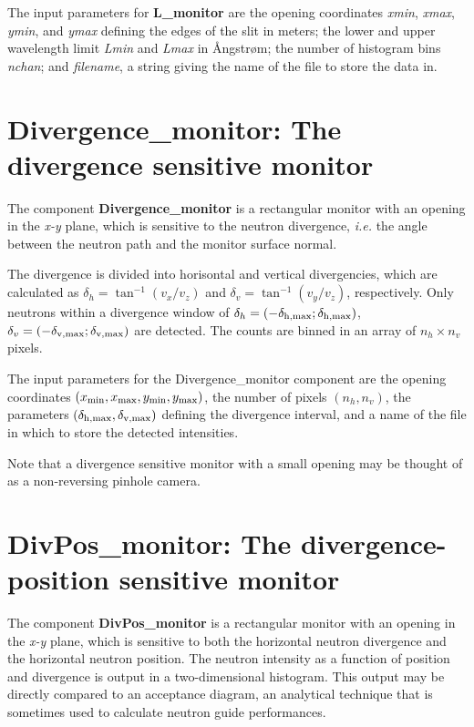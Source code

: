 The input parameters for {\bf L\_monitor} are the opening
coordinates \textit{xmin}, \textit{xmax}, \textit{ymin}, and
\textit{ymax} defining the edges of the slit in meters;
the lower and upper wavelength limit \textit{Lmin} and
\textit{Lmax} in {\AA}ngstr{\o}m; the number of histogram bins
\textit{nchan}; and \textit{filename}, a
string giving the name of the file to store the data in.


\section{Divergence\_monitor: The divergence sensitive monitor}

The component {\bf Divergence\_monitor} is a rectangular monitor
with an opening in the \textit{x-y} plane,
which is sensitive to the neutron divergence, {\em i.e.} the angle
between the neutron path and the monitor surface normal.
 
The divergence is divided into horisontal and vertical divergencies,
which are calculated as $\delta_h = \tan^{-1}(v_x/v_z)$ 
and $\delta_v = \tan^{-1}(v_y/v_z)$, respectively. 
Only neutrons within a divergence window of 
$\delta_h = (-\delta_{\rm h,max} ; \delta_{\rm h,max})$, 
$\delta_v = (-\delta_{\rm v,max} ; \delta_{\rm v,max})$ 
are detected. The counts are binned in an array of $n_h \times n_v$ pixels.

The input parameters for the Divergence\_monitor component are the opening coordinates
$(x_{\rm min}, x_{\rm max}, y_{\rm min}, y_{\rm max})$, 
the number of pixels $(n_h, n_v)$, 
the parameters $(\delta_{\rm h,max}, \delta_{\rm v,max})$ 
defining the divergence interval,
and a name of the file in which to store the detected intensities.

Note that a divergence sensitive monitor with a small opening may be 
thought of as a non-reversing pinhole camera.


\section{DivPos\_monitor: The divergence-position sensitive monitor}

The component {\bf DivPos\_monitor} is a rectangular monitor with an
opening in the \textit{x-y} plane, which is sensitive to both the
horizontal neutron divergence and the horizontal neutron position. The
neutron intensity as a function of position and divergence is output in
a two-dimensional histogram. This output may be directly compared to an
acceptance diagram, an analytical technique that is sometimes used to
calculate neutron guide performances.
 
